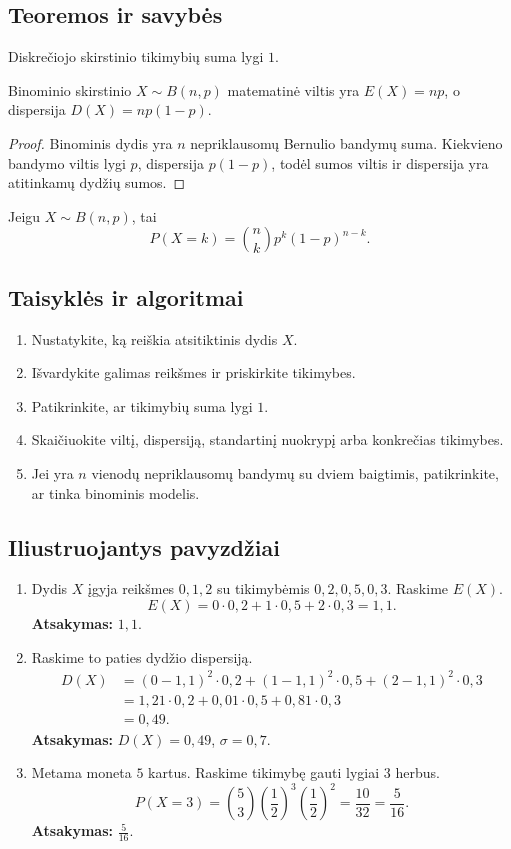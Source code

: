\subsection{Teoremos ir savybės}
\begin{savybe}
Diskrečiojo skirstinio tikimybių suma lygi \(1\).
\end{savybe}
\begin{teorema}
Binominio skirstinio \(X\sim B(n,p)\) matematinė viltis yra \(E(X)=np\), o dispersija \(D(X)=np(1-p)\).
\end{teorema}
\begin{proof}
Binominis dydis yra \(n\) nepriklausomų Bernulio bandymų suma. Kiekvieno bandymo viltis lygi \(p\), dispersija \(p(1-p)\), todėl sumos viltis ir dispersija yra atitinkamų dydžių sumos.
\end{proof}
\begin{savybe}
Jeigu \(X\sim B(n,p)\), tai
\[
P(X=k)=\binom{n}{k}p^k(1-p)^{n-k}.
\]
\end{savybe}

\subsection{Taisyklės ir algoritmai}
\begin{enumerate}[label=\arabic*.]
\item Nustatykite, ką reiškia atsitiktinis dydis \(X\).
\item Išvardykite galimas reikšmes ir priskirkite tikimybes.
\item Patikrinkite, ar tikimybių suma lygi \(1\).
\item Skaičiuokite viltį, dispersiją, standartinį nuokrypį arba konkrečias tikimybes.
\item Jei yra \(n\) vienodų nepriklausomų bandymų su dviem baigtimis, patikrinkite, ar tinka binominis modelis.
\end{enumerate}

\subsection{Iliustruojantys pavyzdžiai}
\begin{enumerate}[label=\arabic*.]
\item Dydis \(X\) įgyja reikšmes \(0,1,2\) su tikimybėmis \(0{,}2,0{,}5,0{,}3\). Raskime \(E(X)\).
\[
E(X)=0\cdot0{,}2+1\cdot0{,}5+2\cdot0{,}3=1{,}1.
\]
\textbf{Atsakymas:} \(1{,}1\).

\item Raskime to paties dydžio dispersiją.
\begin{align}
D(X)&=(0-1{,}1)^2\cdot0{,}2+(1-1{,}1)^2\cdot0{,}5+(2-1{,}1)^2\cdot0{,}3\\
&=1{,}21\cdot0{,}2+0{,}01\cdot0{,}5+0{,}81\cdot0{,}3\\
&=0{,}49.
\end{align}
\textbf{Atsakymas:} \(D(X)=0{,}49\), \(\sigma=0{,}7\).

\item Metama moneta \(5\) kartus. Raskime tikimybę gauti lygiai \(3\) herbus.
\[
P(X=3)=\binom53\left(\frac12\right)^3\left(\frac12\right)^2=\frac{10}{32}=\frac{5}{16}.
\]
\textbf{Atsakymas:} \(\frac{5}{16}\).
\end{enumerate}


